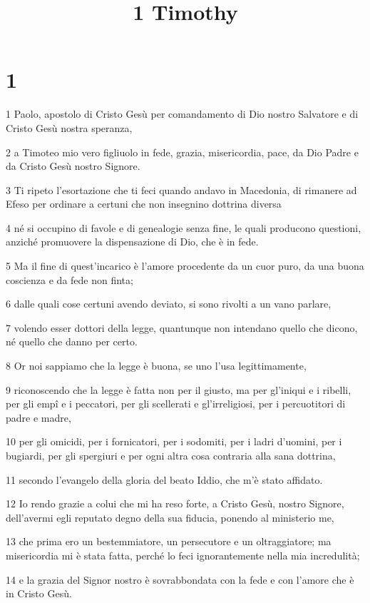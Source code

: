

\title{1 Timothy}


\chapter{1}

\par 1 Paolo, apostolo di Cristo Gesù per comandamento di Dio nostro Salvatore e di Cristo Gesù nostra speranza,
\par 2 a Timoteo mio vero figliuolo in fede, grazia, misericordia, pace, da Dio Padre e da Cristo Gesù nostro Signore.
\par 3 Ti ripeto l'esortazione che ti feci quando andavo in Macedonia, di rimanere ad Efeso per ordinare a certuni che non insegnino dottrina diversa
\par 4 né si occupino di favole e di genealogie senza fine, le quali producono questioni, anziché promuovere la dispensazione di Dio, che è in fede.
\par 5 Ma il fine di quest'incarico è l'amore procedente da un cuor puro, da una buona coscienza e da fede non finta;
\par 6 dalle quali cose certuni avendo deviato, si sono rivolti a un vano parlare,
\par 7 volendo esser dottori della legge, quantunque non intendano quello che dicono, né quello che danno per certo.
\par 8 Or noi sappiamo che la legge è buona, se uno l'usa legittimamente,
\par 9 riconoscendo che la legge è fatta non per il giusto, ma per gl'iniqui e i ribelli, per gli empî e i peccatori, per gli scellerati e gl'irreligiosi, per i percuotitori di padre e madre,
\par 10 per gli omicidi, per i fornicatori, per i sodomiti, per i ladri d'uomini, per i bugiardi, per gli spergiuri e per ogni altra cosa contraria alla sana dottrina,
\par 11 secondo l'evangelo della gloria del beato Iddio, che m'è stato affidato.
\par 12 Io rendo grazie a colui che mi ha reso forte, a Cristo Gesù, nostro Signore, dell'avermi egli reputato degno della sua fiducia, ponendo al ministerio me,
\par 13 che prima ero un bestemmiatore, un persecutore e un oltraggiatore; ma misericordia mi è stata fatta, perché lo feci ignorantemente nella mia incredulità;
\par 14 e la grazia del Signor nostro è sovrabbondata con la fede e con l'amore che è in Cristo Gesù.
